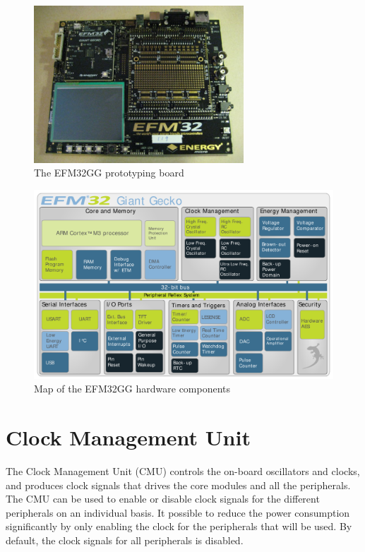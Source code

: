\begin{figure}[H]
  \centering
  \includegraphics[width=0.7\textwidth]{images/efm_board.jpg}
  \caption{The EFM32GG prototyping board}\label{fig:efm-board}
\end{figure}

\begin{figure}[H]
  \centering
  \includegraphics[width=\textwidth]{images/giant_gecko_map.png}
  \caption{Map of the EFM32GG hardware components}\label{fig:giant-gecko-map}
\end{figure}


\section{Clock Management Unit}\label{sec:cmu}
The Clock Management Unit (CMU) controls the on-board oscillators and clocks, and produces clock signals that drives the core modules and all the peripherals. The CMU can be used to enable or disable clock signals for the different peripherals on an individual basis. It possible to reduce the power consumption significantly by only enabling the clock for the peripherals that will be used. By default, the clock signals for all peripherals is disabled. 

